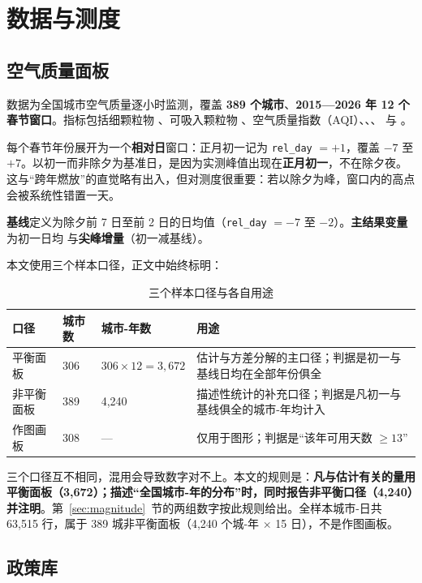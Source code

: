 \section{数据与测度}

\subsection{空气质量面板}\label{sec:panel}

数据为全国城市空气质量逐小时监测，覆盖 \textbf{389 个城市}、\textbf{2015—2026 年 12 个春节窗口}。指标包括细颗粒物 、可吸入颗粒物 、空气质量指数（AQI）、\SOtwo{}、\NOtwo{}、\Othree{} 与 \COone{}。

每个春节年份展开为一个\textbf{相对日}窗口：正月初一记为 \texttt{rel\_day} $=+1$，覆盖 $-7$ 至 $+7$。以初一而非除夕为基准日，是因为实测峰值出现在\textbf{正月初一}，不在除夕夜。这与“跨年燃放”的直觉略有出入，但对测度很重要：若以除夕为峰，窗口内的高点会被系统性错置一天。

\textbf{基线}定义为除夕前 7 日至前 2 日的日均值（\texttt{rel\_day} $=-7$ 至 $-2$）。\textbf{主结果变量}为初一日均  与\textbf{尖峰增量}（初一减基线）。

本文使用三个样本口径，正文中始终标明：

\begin{table}[H]
\centering
\caption{三个样本口径与各自用途}
\label{tab:samples}
\small
\begin{tabular}{L{3.6cm}L{3.2cm}L{3.0cm}L{4.2cm}}
\toprule
\textbf{口径} & \textbf{城市数} & \textbf{城市-年数} & \textbf{用途} \\
\midrule
平衡面板 & 306 & $306\times12=3{,}672$ & 估计与方差分解的主口径；判据是初一与基线日均在全部年份俱全 \\
非平衡面板 & 389 & 4{,}240 & 描述性统计的补充口径；判据是凡初一与基线俱全的城市-年均计入 \\
作图画板 & 308 & — & 仅用于图形；判据是“该年可用天数 $\geq 13$” \\
\bottomrule
\end{tabular}
\end{table}

\noindent 三个口径互不相同，混用会导致数字对不上。本文的规则是：\textbf{凡与估计有关的量用平衡面板（3,672）；描述“全国城市-年的分布”时，同时报告非平衡口径（4,240）并注明}。第~\ref{sec:magnitude}~节的两组数字按此规则给出。全样本城市-日共 63,515 行，属于 389 城非平衡面板（4,240 个城-年 $\times$ 15 日），不是作图画板。

\subsection{政策库}

